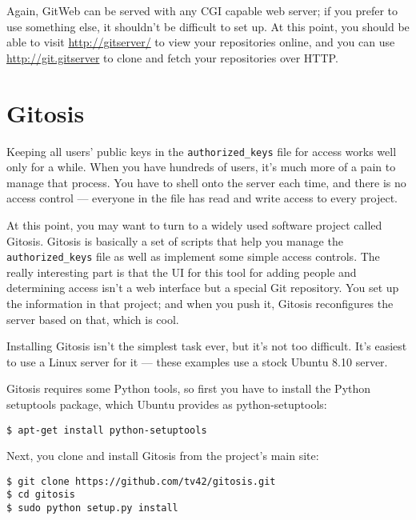 \documentclass[a4paper]{book}
\begin{document}
Again, GitWeb can be served with any CGI capable web server; if you prefer to use something else, it shouldn't be difficult to set up. At this point, you should be able to visit \url{http://gitserver/} to view your repositories online, and you can use \url{http://git.gitserver} to clone and fetch your repositories over HTTP.

\section{Gitosis}\label{gitosis}

Keeping all users' public keys in the \texttt{authorized\_keys} file for access works well only for a while. When you have hundreds of users, it's much more of a pain to manage that process. You have to shell onto the server each time, and there is no access control --- everyone in the file has read and write access to every project.

At this point, you may want to turn to a widely used software project called Gitosis. Gitosis is basically a set of scripts that help you manage the \texttt{authorized\_keys} file as well as implement some simple access controls. The really interesting part is that the UI for this tool for adding people and determining access isn't a web interface but a special Git repository. You set up the information in that project; and when you push it, Gitosis reconfigures the server based on that, which is cool.

Installing Gitosis isn't the simplest task ever, but it's not too difficult. It's easiest to use a Linux server for it --- these examples use a stock Ubuntu 8.10 server.

Gitosis requires some Python tools, so first you have to install the Python setuptools package, which Ubuntu provides as python-setuptools:

\begin{shaded}\begin{verbatim}
$ apt-get install python-setuptools
\end{verbatim}\end{shaded}

Next, you clone and install Gitosis from the project's main site:

\begin{shaded}\begin{verbatim}
$ git clone https://github.com/tv42/gitosis.git
$ cd gitosis
$ sudo python setup.py install
\end{verbatim}\end{shaded}
\end{document}
